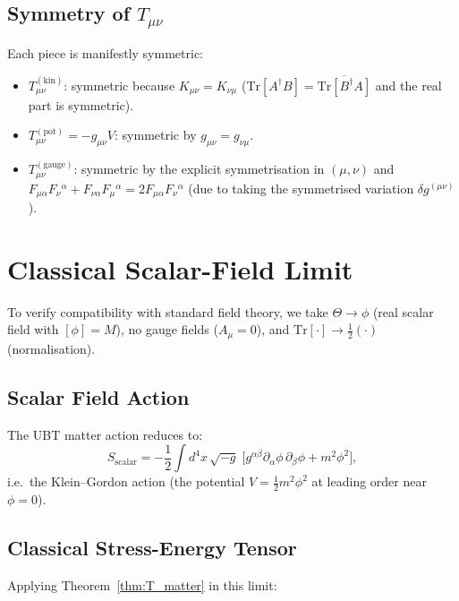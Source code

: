 \documentclass[12pt]{article}
\newcommand{\Tr}{\mathrm{Tr}}
\begin{document}
\subsection{Symmetry of $T_{\mu\nu}$}

Each piece is manifestly symmetric:
\begin{itemize}
  \item $T^{(\mathrm{kin})}_{\mu\nu}$: symmetric because $K_{\mu\nu} = K_{\nu\mu}$
        ($\Tr[A^\dagger B] = \overline{\Tr[B^\dagger A]}$ and the real part is symmetric).
  \item $T^{(\mathrm{pot})}_{\mu\nu} = -g_{\mu\nu}V$: symmetric by $g_{\mu\nu} = g_{\nu\mu}$.
  \item $T^{(\mathrm{gauge})}_{\mu\nu}$: symmetric by the explicit symmetrisation
        in $(\mu,\nu)$ and $F_{\mu\alpha}F_\nu{}^\alpha + F_{\nu\alpha}F_\mu{}^\alpha = 2F_{\mu\alpha}F_\nu{}^\alpha$ (due to taking the symmetrised variation $\delta g^{(\mu\nu)}$).
\end{itemize}

\section{Classical Scalar-Field Limit}
\label{sec:scalar_limit}

To verify compatibility with standard field theory, we take
$\Theta \to \phi$ (real scalar field with $[\phi] = M$), no gauge fields
($A_\mu = 0$), and $\Tr[\cdot] \to \tfrac{1}{2}(\cdot)$ (normalisation).

\subsection{Scalar Field Action}

The UBT matter action reduces to:
\begin{equation}
  S_{\mathrm{scalar}} = -\frac{1}{2}\int d^4x\,\sqrt{-g}\;
    \bigl[g^{\alpha\beta}\partial_\alpha\phi\,\partial_\beta\phi + m^2\phi^2\bigr],
\end{equation}
i.e.\ the Klein--Gordon action (the potential $V = \tfrac{1}{2}m^2\phi^2$
at leading order near $\phi=0$).

\subsection{Classical Stress-Energy Tensor}

Applying Theorem~\ref{thm:T_matter} in this limit:
\end{document}
